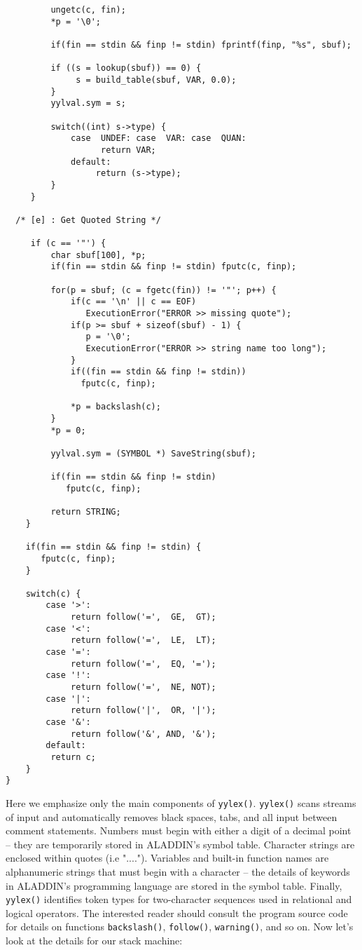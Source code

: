 \begin{footnotesize}
\begin{verbatim}
         ungetc(c, fin);
         *p = '\0';

         if(fin == stdin && finp != stdin) fprintf(finp, "%s", sbuf);

         if ((s = lookup(sbuf)) == 0) {
              s = build_table(sbuf, VAR, 0.0);
         }
         yylval.sym = s;

         switch((int) s->type) {
             case  UNDEF: case  VAR: case  QUAN:
                   return VAR;
             default:
                  return (s->type);
         }
     }

  /* [e] : Get Quoted String */

     if (c == '"') {
         char sbuf[100], *p;
         if(fin == stdin && finp != stdin) fputc(c, finp);

         for(p = sbuf; (c = fgetc(fin)) != '"'; p++) {
             if(c == '\n' || c == EOF)
                ExecutionError("ERROR >> missing quote");
             if(p >= sbuf + sizeof(sbuf) - 1) {
                p = '\0';
                ExecutionError("ERROR >> string name too long");
             }
             if((fin == stdin && finp != stdin))
               fputc(c, finp);

             *p = backslash(c);
         }
         *p = 0;

         yylval.sym = (SYMBOL *) SaveString(sbuf);

         if(fin == stdin && finp != stdin)
            fputc(c, finp);

         return STRING;
    }

    if(fin == stdin && finp != stdin) {
       fputc(c, finp);
    }

    switch(c) {
        case '>': 
             return follow('=',  GE,  GT);
        case '<':
             return follow('=',  LE,  LT);
        case '=':
             return follow('=',  EQ, '=');
        case '!':
             return follow('=',  NE, NOT);
        case '|':
             return follow('|',  OR, '|');
        case '&':
             return follow('&', AND, '&');
        default:
	     return c;
    }
}
\end{verbatim}
\end{footnotesize}

\vspace{0.15 in}\noindent
Here we emphasize only the main components of {\tt yylex()}.
{\tt yylex()} scans streams of input and automatically
removes black spaces, tabs, and all input between comment statements.
Numbers must begin with either a digit of a decimal point -- they are
temporarily stored in ALADDIN's symbol table.
Character strings are enclosed within quotes (i.e {"...."}).
Variables and built-in function names are alphanumeric strings that
must begin with a character -- the details of keywords in ALADDIN's
programming language are stored in the symbol table.
Finally, {\tt yylex()} identifies token types for
two-character sequences used in relational and logical operators.
The interested reader should consult the program source code for
details on functions {\tt backslash()}, {\tt follow()}, {\tt warning()}, and so on.
Now let's look at the details for our stack machine:

